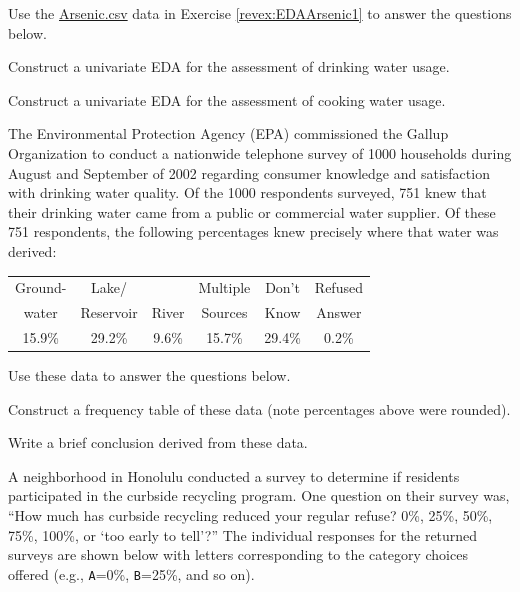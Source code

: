 \documentclass[10pt,openany]{book}\usepackage[]{graphicx}\usepackage[]{color}
\begin{document}
\begin{exsection}
  \item \label{revex:EDAArsenic2} \rhw{} Use the \href{https://raw.githubusercontent.com/droglenc/NCData/master/Arsenic.csv}{Arsenic.csv} data in Exercise \ref{revex:EDAArsenic1} to answer the questions below. 
  \begin{Enumerate}
    \item Construct a univariate EDA for the assessment of drinking water usage.
    \item Construct a univariate EDA for the assessment of cooking water usage.
  \end{Enumerate}

  \item \label{revex:cuEDAEPA}The Environmental Protection Agency (EPA) commissioned the Gallup Organization to conduct a nationwide telephone survey of 1000 households during August and September of 2002 regarding consumer knowledge and satisfaction with drinking water quality.  Of the 1000 respondents surveyed, 751 knew that their drinking water came from a public or commercial water supplier.  Of these 751 respondents, the following percentages knew precisely where that water was derived:

  \begin{center}
  \begin{tabular}{c|c|c|c|c|c}
    \hline\hline
    Ground- & Lake/ &  & Multiple & Don't & Refused \\
    water & Reservoir & River & Sources & Know & Answer \\
    \hline
    15.9\% & 29.2\% & 9.6\% & 15.7\% & 29.4\% & 0.2\% \\
    \hline\hline
  \end{tabular}
  \end{center}

  Use these data to answer the questions below. 
  \begin{Enumerate}
    \item Construct a frequency table of these data (note percentages above were rounded).
    \item Write a brief conclusion derived from these data.
  \end{Enumerate}

  \item \label{revex:cuEDAHI} \rhw{} A neighborhood in Honolulu conducted a survey to determine if residents participated in the curbside recycling program.  One question on their survey was, ``How much has curbside recycling reduced your regular refuse? 0\%, 25\%, 50\%, 75\%, 100\%, or `too early to tell'?''  The individual responses for the returned surveys are shown below with letters corresponding to the category choices offered (e.g., \verb"A"=0\%, \verb"B"=25\%, and so on).


\end{exsection}
\end{document}

